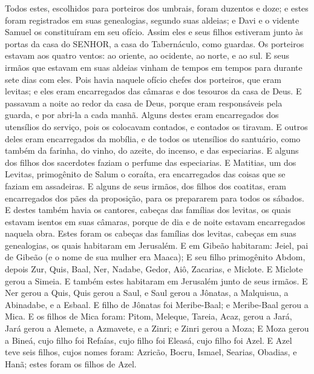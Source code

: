 {  Todos estes, escolhidos para porteiros dos umbrais, foram duzentos e doze; e estes foram registrados em suas genealogias, segundo suas aldeias; e Davi e o vidente Samuel os constituíram em seu ofício.
  Assim eles e seus filhos estiveram junto às portas da casa do SENHOR, a casa do Tabernáculo, como guardas.
  Os porteiros estavam aos quatro ventos: ao oriente, ao ocidente, ao norte, e ao sul.
  E seus irmãos que estavam em suas aldeias vinham de tempos em tempos para durante sete dias {} com eles.
  Pois havia naquele ofício chefes dos porteiros, que eram levitas; e eles eram encarregados das câmaras e dos tesouros da casa de Deus.
  E passavam a noite ao redor da casa de Deus, porque eram responsáveis pela guarda, e por abri-la a cada manhã.
  Alguns destes eram encarregados dos utensílios do serviço, pois os colocavam contados, e contados os tiravam.
  E outros deles eram encarregados da mobília, e de todos os utensílios do santuário, como também da farinha, do vinho, do azeite, do incenso, e das especiarias.
  E alguns dos filhos dos sacerdotes faziam o perfume das especiarias.
  E Matitias, um dos Levitas, primogênito de Salum o coraíta, era encarregados das coisas que se faziam em assadeiras.
  E alguns de seus irmãos, dos filhos dos coatitas, eram encarregados dos pães da proposição, para os prepararem para todos os sábados.
  E destes também havia os cantores, cabeças das famílias dos levitas, os quais estavam isentos {} em suas câmaras, porque de dia e de noite estavam encarregados naquela obra.
  Estes foram os cabeças das famílias dos levitas, cabeças em suas genealogias, os quais habitaram em Jerusalém.
  E em Gibeão habitaram: Jeiel, pai de Gibeão (e o nome de sua mulher era Maaca);
  E seu filho primogênito Abdom, depois Zur, Quis, Baal, Ner, Nadabe,
  Gedor, Aiô, Zacarias, e Miclote.
  E Miclote gerou a Simeia. E também estes habitaram em Jerusalém junto de seus irmãos.
  E Ner gerou a Quis, Quis gerou a Saul, e Saul gerou a Jônatas, a Malquisua, a Abinadabe, e a Esbaal.
  E filho de Jônatas foi Meribe-Baal; e Meribe-Baal gerou a Mica.
  E os filhos de Mica foram: Pitom, Meleque, Tareia,
   Acaz,
{} gerou a Jará, Jará gerou a Alemete, a Azmavete, e a Zinri; e Zinri gerou a Moza;
  E Moza gerou a Bineá, cujo filho foi Refaías, cujo filho foi Eleasá, cujo filho foi Azel.
  E Azel teve seis filhos, cujos nomes foram: Azricão, Bocru, Ismael, Searias, Obadias, e Hanã; estes foram os filhos de Azel.
\par }

